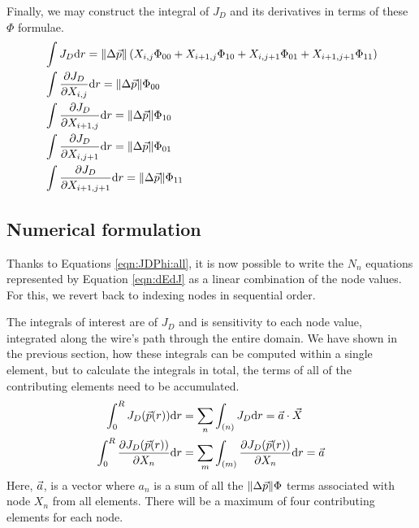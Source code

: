 Finally, we may construct the integral of $J_D$ and its derivatives in terms of these $\Phi$ formulae.
\begin{subequations}\label{eqn:JDPhi:all}
\begin{align}
&\int J_D \mathrm{d}r = \|\Delta \vec{p}\| \left( X_{i,j} \Phi_{00} + X_{i+1,j} \Phi_{10} + X_{i,j+1} \Phi_{01} + X_{i+1,j+1} \Phi_{11} \right)\\
&\int \frac{\partial J_D}{\partial X_{i,j}} \mathrm{d} r = \|\Delta \vec{p}\| \Phi_{00}\\
&\int \frac{\partial J_D}{\partial X_{i+1,j}} \mathrm{d} r = \|\Delta \vec{p}\| \Phi_{10}\\
&\int \frac{\partial J_D}{\partial X_{i,j+1}} \mathrm{d} r = \|\Delta \vec{p}\| \Phi_{01}\\
&\int \frac{\partial J_D}{\partial X_{i+1,j+1}} \mathrm{d} r = \|\Delta \vec{p}\| \Phi_{11}
\end{align}
\end{subequations}

\subsection{Numerical formulation}\label{sec:numerical}

Thanks to Equations \ref{eqn:JDPhi:all}, it is now possible to write the $N_n$ equations represented by Equation \ref{eqn:dEdJ} as a linear combination of the node values.  For this, we revert back to indexing nodes in sequential order.

The integrals of interest are of $J_D$ and is sensitivity to each node value, integrated along the wire's path through the entire domain.  We have shown in the previous section, how these integrals can be computed within a single element, but to calculate the integrals in total, the terms of all of the contributing elements need to be accumulated.
\begin{align}
\int_0^R J_D(\vec{p}(r)) \mathrm{d}r &= \sum_n \int_{(n)}J_D \mathrm{d}r = \vec{a} \cdot \vec{X}\\
\int_0^R \frac{\partial J_D(\vec{p}(r))}{\partial X_n} \mathrm{d}r &= \sum_m \int_{(m)} \frac{\partial J_D(\vec{p}(r))}{\partial X_n} \mathrm{d}r = \vec{a}
\end{align}
Here, $\vec{a}$, is a vector where $a_n$ is a sum of all the $\|\Delta \vec{p}\| \Phi$ terms associated with node $X_n$ from all elements.  There will be a maximum of four contributing elements for each node.

